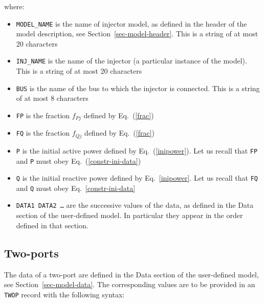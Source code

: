 where:
\begin{itemize}
\item{\tt MODEL\_NAME} is the name of injector model, as defined in the header of the model description, see Section~\ref{sec-model-header}. This is a string of at most 20 characters
\item{\tt INJ\_NAME} is the name of the injector (a particular instance of the model). This is a string of at most 20 characters
\item{\tt BUS} is the name of the bus to which the injector is connected. This is a string of at most 8 characters
\item{\tt FP} is the fraction $f_{Pj}$ defined by Eq.~(\ref{frac})
\item{\tt FQ} is the fraction $f_{Qj}$ defined by Eq.~(\ref{frac})
\item{\tt P} is the initial active power defined by Eq.~(\ref{inipower}). Let us recall that {\tt FP} and {\tt P} must obey Eq.~(\ref{constr-ini-data})
\item{\tt Q} is the initial reactive power defined by Eq.~\ref{inipower}. Let us recall that {\tt FQ} and {\tt Q} must obey Eq.~\ref{constr-ini-data}
\item{\tt DATA1 DATA2 \ldots} are the successive values of the data, as defined in the Data section of the user-defined model. In particular they appear in the order defined in that section.
\end{itemize}


\subsection{Two-ports}\label{format-twop}

The data of a two-port are defined in the Data section of the user-defined model, see Section~\ref{sec-model-data}. The corresponding values are to be provided in an {\tt TWOP} record with the following syntax:

\hspace*{5ex}{\tt TWOP MODEL\_NAME TWOP\_NAME BUS1 BUS2 IND FP1  FQ1  P2  Q2  DATA1 DATA2 \ldots ;}

